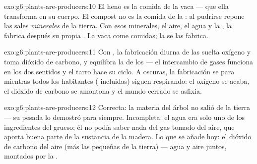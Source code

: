 \begin{solution}{exo:g6:plants-are-producers:10}
El heno es la comida de la vaca ---  que ella
transforma en su cuerpo. El compost no es la comida de la : al
pudrirse repone las sales \emph{minerales} de la tierra. Con esos
minerales, el aire, el agua y la , la  fabrica después su
propia . La vaca come comidas; la  se las fabrica.
\end{solution}

\begin{solution}{exo:g6:plants-are-producers:11}
Con , la fabricación diurna de las  suelta oxígeno y toma
dióxido de carbono, y equilibra la  de los  --- el
intercambio de gases funciona en los dos sentidos y el tarro hace su
ciclo. A oscuras, la fabricación se para mientras todos los habitantes
( incluidas) siguen respirando: el oxígeno se acaba, el dióxido
de carbono se amontona y el mundo cerrado se asfixia.
\end{solution}

\begin{solution}{exo:g6:plants-are-producers:12}
Correcta: la materia del árbol no salió de la tierra --- su pesada lo
demostró para siempre. Incompleta: el agua era solo uno de los
ingredientes del grueso; él no podía saber nada del gas tomado del
aire, que aporta buena parte de la sustancia de la madera. Lo que se
añade hoy: el dióxido de carbono del aire (más las pequeñas  de la tierra) --- agua y aire juntos, montados por la .
\end{solution}


